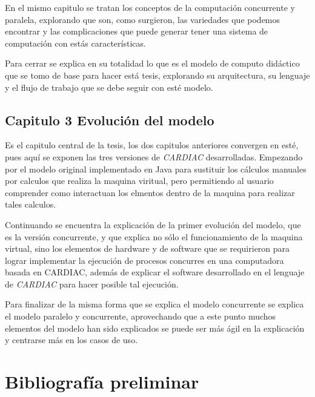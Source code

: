 \documentclass[letterpaper,12pt,oneside]{article}
\begin{document}
			En el mismo capitulo se tratan los conceptos de la computación concurrente y paralela, explorando que son, como surgieron,
			las variedades que podemos encontrar y las complicaciones que puede generar tener una sistema de computación
			con estás características.
			
			Para cerrar se explica en su totalidad lo que es el modelo de computo didáctico  que se tomo de base para hacer está tesis,
			explorando su arquitectura, su lenguaje y el flujo de trabajo que se debe seguir con esté modelo.
		
		\subsection{Capitulo 3 Evolución del modelo}	
		
			Es el capitulo central de la tesis, los dos capitulos anteriores convergen en esté, pues aquí se exponen las tres versiones
			de \textit{CARDIAC}	desarrolladas. Empezando por el modelo original implementado en Java para sustituir los cálculos
			manuales por calculos que realiza la maquina viritual, pero permitiendo al usuario comprender como interactuan los
			elmentos dentro de la maquina para realizar tales calculos. 
			
			Continuando se encuentra la explicación de la primer evolución del modelo, que es la
			versión concurrente, y que explica no sólo el funcionamiento de la maquina virtual, sino los elementos
			de hardware y de software que se requirieron para
			lograr implementar la ejecución de procesos concurres en una computadora basada en CARDIAC, además de explicar
			el software desarrollado en el lenguaje de \textit{CARDIAC} para hacer posible tal ejecución.
			
			Para finalizar de la misma forma que se explica el modelo concurrente se explica el modelo paralelo y concurrente, aprovechando
			que a este punto muchos elementos del modelo han sido explicados se puede ser más ágil en la explicación y
			centrarse más en los casos de uso.
		
		
		\section{Bibliografía preliminar}
		
		
\end{document}
